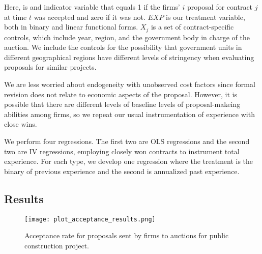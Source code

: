 Here, is and indicator variable that equals 1 if the firms' $i$ proposal for contract $j$ at time $t$ was accepted and zero if it was not. $EXP$ is our treatment variable, both in binary and linear functional forms. $X_{j}$ is a set of contract-specific controls, which include year, region, and the government body in charge of the auction. We include the controls for the possibility that government units in different  geographical regions have different levels of stringency when evaluating proposals for similar projects.

We are less worried about endogeneity with unobserved cost factors since formal revision does not relate to economic aspects of the proposal. However, it is possible that there are different levels of baseline levels of proposal-makeing abilities among firms, so we repeat our usual instrumentation of experience with close wins.

We perform four regressions. The first two are OLS regressions and the second two are IV regressions, employing closely won contracts to instrument total experience. For each type, we develop one regression where the treatment is the binary of previous experience and the second is annualized past experience.

\subsection{Results}
\begin{figure}
  \texttt{[image: plot\_acceptance\_results.png]}
  \caption{Acceptance rate for proposals sent by firms to auctions for public construction project.}
  \label{fig:plot_acceptance_results}
\end{figure}


